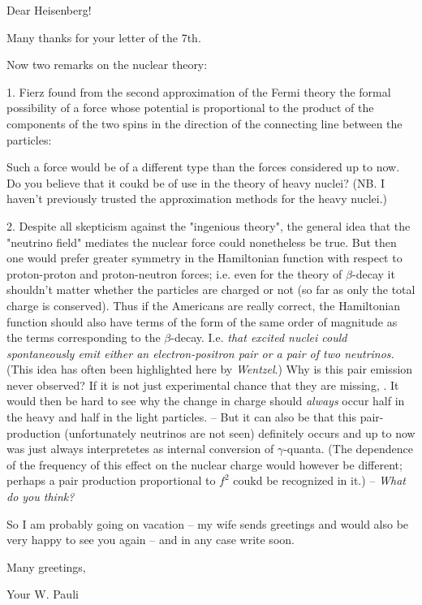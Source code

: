 \date{December 13, 1936}

\nc{\vsigma}{\vec{\sigma}}

Dear Heisenberg!

Many thanks for your letter of the 7th. 

Now two remarks on the nuclear theory:

1. Fierz found from the second approximation of the Fermi theory the formal possibility of a force whose potential is proportional to the product of the components of the two spins in the direction of the connecting line between the particles:

Such a force would be of a different type than the forces considered up to now. Do you believe that it coukd be of use in the theory of heavy nuclei? (NB. I haven't previously trusted the approximation methods for the heavy nuclei.)

2. Despite all skepticism against the "ingenious theory", the general idea that the "neutrino field" mediates the nuclear force could nonetheless be true. But then one would prefer greater symmetry in the Hamiltonian function with respect to proton-proton and proton-neutron forces; i.e. even for the theory of $\beta$-decay it shouldn't matter whether the particles are charged or not (so far as only the total charge is conserved). Thus if the Americans are really correct, the Hamiltonian function should also have terms of the form
of the same order of magnitude as the terms corresponding to the $\beta$-decay. I.e. \textit{that excited nuclei could spontaneously emit either an electron-positron pair or a pair of two neutrinos.} (This idea has often been highlighted here by \textit{Wentzel}.) Why is this pair emission never observed? If it is not just experimental chance that they are missing, . It would then be hard to see why the change in charge should \textit{always} occur half in the heavy and half in the light particles. -- But it can also be that this pair-production (unfortunately neutrinos are not seen) definitely occurs and up to now was just always interpretetes as internal conversion of $\gamma$-quanta. (The dependence of the frequency of this effect on the nuclear charge would however be different; perhaps a pair production proportional to $f^2$ coukd be recognized in it.) -- \textit{What do you think?}

So I am probably going on vacation  -- my wife sends greetings and would also be very happy to see you again -- and in any case write soon.

Many greetings,

Your W. Pauli

